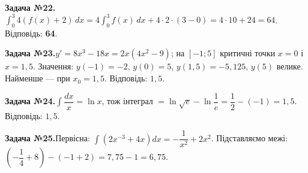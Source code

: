\documentclass[12pt]{article}
\begin{document}
\begin{tcolorbox}[colback=titleBg!40, colframe=mainGreen!55, boxrule=0.4pt, arc=2pt, left=6pt, right=6pt, top=4pt, bottom=4pt, breakable]
\noindent\small\textbf{Задача №22.}\quad $\displaystyle\int_0^3 4(f(x)+2)\,dx=4\int_0^3 f(x)\,dx+4\cdot 2\cdot(3-0)=4\cdot 10+24=64$. Відповідь: \textbf{64}.
\par\vspace{0.1cm}\hfill\hyperlink{task:22}{}
\end{tcolorbox}
\par\vspace{0.3cm}\noindent\hypertarget{sol:23}{}
\begin{tcolorbox}[colback=titleBg!40, colframe=mainGreen!55, boxrule=0.4pt, arc=2pt, left=6pt, right=6pt, top=4pt, bottom=4pt, breakable]
\noindent\small\textbf{Задача №23.}\quad $y'=8x^3-18x=2x(4x^2-9)$; на $[-1;5]$ критичні точки $x=0$ і $x=1{,}5$. Значення: $y(-1)=-2$, $y(0)=5$, $y(1{,}5)=-5{,}125$, $y(5)$ велике. Найменше — при $x_0=1{,}5$. Відповідь: $1{,}5$.
\par\vspace{0.1cm}\hfill\hyperlink{task:23}{}
\end{tcolorbox}
\par\vspace{0.3cm}\noindent\hypertarget{sol:24}{}
\begin{tcolorbox}[colback=titleBg!40, colframe=mainGreen!55, boxrule=0.4pt, arc=2pt, left=6pt, right=6pt, top=4pt, bottom=4pt, breakable]
\noindent\small\textbf{Задача №24.}\quad $\displaystyle\int \dfrac{dx}{x}=\ln x$, тож інтеграл $=\ln\sqrt{e}-\ln\dfrac{1}{e}=\dfrac{1}{2}-(-1)=1{,}5$. Відповідь: \textbf{$1{,}5$}.
\par\vspace{0.1cm}\hfill\hyperlink{task:24}{}
\end{tcolorbox}
\par\vspace{0.3cm}\noindent\hypertarget{sol:25}{}
\begin{tcolorbox}[colback=titleBg!40, colframe=mainGreen!55, boxrule=0.4pt, arc=2pt, left=6pt, right=6pt, top=4pt, bottom=4pt, breakable]
\noindent\small\textbf{Задача №25.}\quad Первісна: $\displaystyle\int\!\left(2x^{-3}+4x\right)dx=-\dfrac{1}{x^2}+2x^2$. Підставляємо межі: $\left(-\dfrac{1}{4}+8\right)-\left(-1+2\right)=7{,}75-1=6{,}75$.
\par\vspace{0.1cm}\hfill\hyperlink{task:25}{}
\end{tcolorbox}
\end{document}
